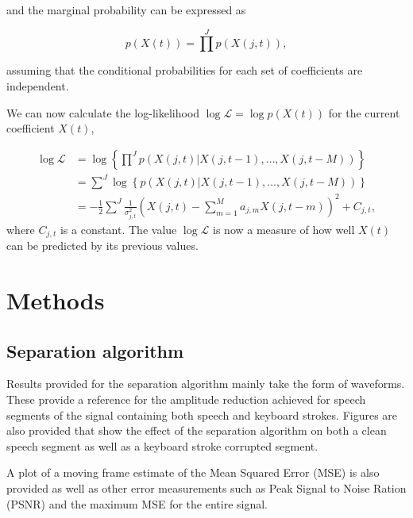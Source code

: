 and the marginal probability can be expressed as

\begin{equation}\label{eq:marginal}
p\left(X(t)\right) = \prod^J p\left(X(j,t)\right),
\end{equation}

assuming that the conditional probabilities for each set of coefficients are independent.

We can now calculate the log-likelihood $\log\mathcal{L} = \log{p\left(X(t)\right)}$ for the current coefficient $X(t)$,

\begin{align}\label{eq:loglike}
\log \mathcal{L} &= \log \left\{ \prod^J p \left( X(j,t) | X(j,t-1),\ldots,X(j,t-M) \right) \right\} \\
&=  \sum^J \log \left\{p \left( X(j,t) | X(j,t-1),\ldots,X(j,t-M) \right) \right\}\nonumber\\
&=  -\frac{1}{2} \sum^J \frac{1}{\sigma_{j,t}^2}\left(X(j,t) -  \sum_{m=1}^{M} a_{j,m} X(j,t - m) \right)^2 + C_{j,t}\nonumber,
\end{align}
where $C_{j,t}$ is a constant. The value $\log \mathcal{L}$ is now a measure of how well $X(t)$ can be predicted by its previous values.

\section{Methods}\label{sec:WPmethods} %
\subsection{Separation algorithm}
Results provided for the separation algorithm mainly take the form of waveforms. These provide a reference for the amplitude reduction achieved for speech segments of the signal containing both speech and keyboard strokes. Figures are also provided that show the effect of the separation algorithm on both a clean speech segment as well as a keyboard stroke corrupted segment.

A plot of a moving frame estimate of the Mean Squared Error (MSE) is also provided as well as other error measurements such as Peak Signal to Noise Ration (PSNR) and the maximum MSE for the entire signal.

